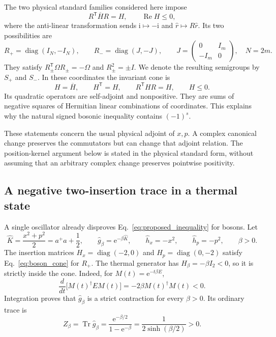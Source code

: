 \documentclass[11pt,a4paper]{article}
\newcommand{\Tr}{\operatorname{Tr}}
\newcommand{\diag}{\operatorname{diag}}
\newcommand{\ee}{\mathrm e}
\newcommand{\ii}{\mathrm i}
\newcommand{\trans}{\mathsf T}
\theoremstyle{remark}
\numberwithin{equation}{section}
\begin{document}
The two physical standard families considered here impose
\begin{equation}
R^\trans\overline H R=H,\qquad \operatorname{Re}H\leq0,
\label{eq:boson_families}
\end{equation}
where the anti-linear transformation sends \(\ii\mapsto-\ii\) and
\(\hat r\mapsto R\hat r\). Its two possibilities are
\begin{equation}
R_+=\diag(I_N,-I_N),\qquad
R_-=\diag(J,-J),\qquad
J=\begin{pmatrix}0&I_m\\-I_m&0\end{pmatrix},\quad N=2m.
\label{eq:boson_R}
\end{equation}
They satisfy \(R_\pm^\trans\Omega R_\pm=-\Omega\) and
\(R_\pm^2=\pm I\). We denote the resulting semigroups by \(S_+\) and
\(S_-\). In these coordinates the invariant cone is
\begin{equation}
H=\overline H,\qquad H^\trans=H,\qquad
R^\trans H R=H,\qquad H\leq0.
\label{eq:boson_cone}
\end{equation}
Its quadratic operators are self-adjoint and nonpositive. They are sums of
negative squares of Hermitian linear combinations of coordinates. This
explains why the natural signed bosonic inequality contains \((-1)^s\).

These statements concern the usual physical adjoint of \(x,p\). A complex
canonical change preserves the commutators but can change that adjoint
relation. The position-kernel argument below is stated in the physical
standard form, without assuming that an arbitrary complex change preserves
pointwise positivity.

\subsection{A negative two-insertion trace in a thermal state}

A single oscillator already disproves Eq.~\eqref{eq:proposed_inequality}
for bosons. Let
\begin{equation}
\hat K=\frac{x^2+p^2}{2}=a^+a+\frac12,\qquad
\hat g_\beta=\ee^{-\beta\hat K},\qquad
\hat h_x=-x^2,\qquad \hat h_p=-p^2,
\qquad\beta>0.
\label{eq:oscillator_example}
\end{equation}
The insertion matrices \(H_x=\diag(-2,0)\) and
\(H_p=\diag(0,-2)\) satisfy Eq.~\eqref{eq:boson_cone} for \(R_+\).
The thermal generator has \(H_\beta=-\beta I_2<0\), so it is strictly
inside the cone. Indeed, for \(M(t)=\ee^{-t\beta E}\),
\begin{equation}
\frac{d}{dt}\bigl[M(t)^\dagger E M(t)\bigr]
=-2\beta M(t)^\dagger M(t)<0.
\label{eq:oscillator_strict}
\end{equation}
Integration proves that \(\hat g_\beta\) is a strict contraction for
every \(\beta>0\). Its ordinary trace is
\begin{equation}
Z_\beta=\Tr\hat g_\beta
=\frac{\ee^{-\beta/2}}{1-\ee^{-\beta}}
=\frac1{2\sinh(\beta/2)}>0.
\label{eq:oscillator_partition}
\end{equation}
\end{document}
